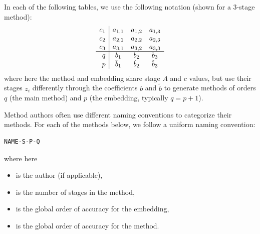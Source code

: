 \documentclass[letterpaper,10pt,english]{sphinxmanual}
\begin{document}
In each of the following tables, we use the following notation (shown
for a 3-stage method):
\begin{gather}
\begin{split}\begin{array}{r|ccc}
  c_1 & a_{1,1} & a_{1,2} & a_{1,3} \\
  c_2 & a_{2,1} & a_{2,2} & a_{2,3} \\
  c_3 & a_{3,1} & a_{3,2} & a_{3,3} \\
  \hline
  q & b_1 & b_2 & b_3 \\
  p & \tilde{b}_1 & \tilde{b}_2 & \tilde{b}_3
\end{array}\end{split}\notag
\end{gather}
where here the method and embedding share stage $A$ and
$c$ values, but use their stages $z_i$ differently through
the coefficients $b$ and $\tilde{b}$ to generate methods
of orders $q$ (the main method) and $p$ (the embedding,
typically $q = p+1$).

Method authors often use different naming conventions to categorize
their methods.  For each of the methods below, we follow a uniform
naming convention:

\begin{Verbatim}[commandchars=\\\{\}]
NAME-S-P-Q
\end{Verbatim}

where here
\begin{itemize}
\item {} 
 is the author (if applicable),

\item {} 
 is the number of stages in the method,

\item {} 
 is the global order of accuracy for the embedding,

\item {} 
 is the global order of accuracy for the method.

\end{itemize}
\end{document}
